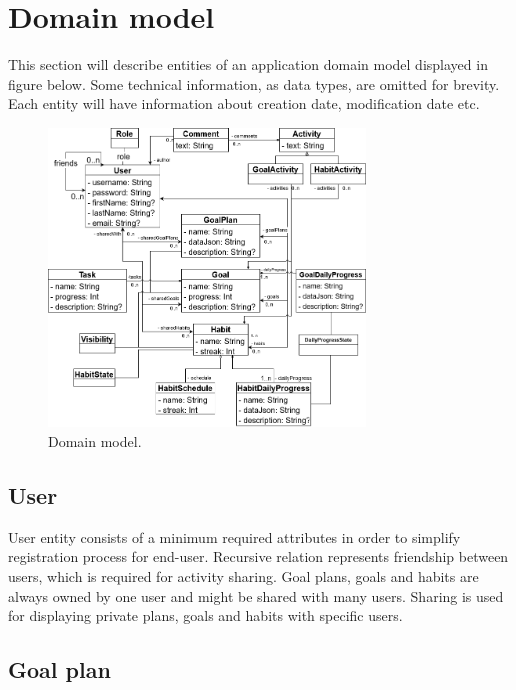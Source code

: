 
\section{Domain model}\label{sec:domain-model}

This section will describe entities of an application domain model displayed in figure below.
Some technical information, as data types, are omitted for brevity.
Each entity will have information about creation date, modification date etc.


\begin{figure}[h]
    \includegraphics[width=0.75\textwidth]{images/pda-domain-model.png}
    \caption{Domain model.}
    \label{fig:domain-model}
\end{figure}


\subsection{User}\label{subsec:user}

User entity consists of a minimum required attributes in order to simplify registration process for end-user.
Recursive relation represents friendship between users, which is required for activity sharing.
Goal plans, goals and habits are always owned by one user and might be shared with many users.
Sharing is used for displaying private plans, goals and habits with specific users.

\subsection{Goal plan}\label{subsec:goal-plan}

